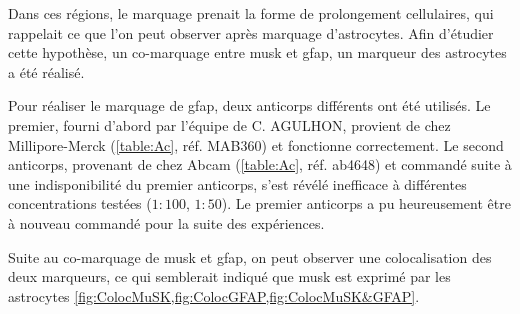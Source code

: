 	Dans ces régions, le marquage prenait la forme de prolongement cellulaires, qui rappelait ce que l'on peut observer après marquage d'astrocytes. Afin d'étudier cette hypothèse, un co-marquage entre \gls{musk} et \gls{gfap}, un marqueur des astrocytes a été réalisé.
	
	Pour réaliser le marquage de \gls{gfap}, deux anticorps différents ont été utilisés. Le premier, fourni d'abord par l'équipe de C. AGULHON, provient de chez Millipore-Merck (\cref{table:Ac}, réf. MAB360) et fonctionne correctement. Le second anticorps, provenant de chez Abcam (\cref{table:Ac}, réf. ab4648) et commandé suite à une indisponibilité du premier anticorps, s'est révélé inefficace à différentes concentrations testées ($1{:}100$, $1{:}50$). Le premier anticorps a pu heureusement être à nouveau commandé pour la suite des expériences.
	
	Suite au co-marquage de \gls{musk} et \gls{gfap}, on peut observer une colocalisation des deux marqueurs, ce qui semblerait indiqué que \gls{musk} est exprimé par les astrocytes \cref{fig:ColocMuSK,fig:ColocGFAP,fig:ColocMuSK&GFAP}. 
	
